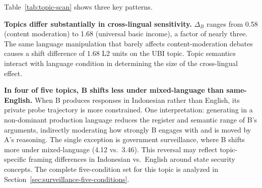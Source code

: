 \documentclass{article}
\begin{document}
\begin{table}[t]
\centering
\caption{Cross-lingual topic divergence scan: five topics ranked by Agent~B's private-probe-shift divergence between mixed-language and same-English conditions (Qwen2.5-7B-Instruct, seed 17, 4 turns, Indonesian/English). $D_B$ values are L2 distances in 8D Schwartz space. Direction: $<$ means B shifts less under mixed-language than same-English; $>$ means the reverse.}
\label{tab:topic-scan}
\end{table}

Table~\ref{tab:topic-scan} shows three key patterns.

\textbf{Topics differ substantially in cross-lingual sensitivity.} $\Delta_B$ ranges from 0.58 (content moderation) to 1.68 (universal basic income), a factor of nearly three. The same language manipulation that barely affects content-moderation debates causes a shift difference of 1.68 L2 units on the UBI topic. Topic semantics interact with language condition in determining the size of the cross-lingual effect.

\textbf{In four of five topics, B shifts less under mixed-language than same-English.} When B produces responses in Indonesian rather than English, its private probe trajectory is more constrained. One interpretation: generating in a non-dominant production language reduces the register and semantic range of B's arguments, indirectly moderating how strongly B engages with and is moved by A's reasoning. The single exception is government surveillance, where B shifts more under mixed-language (4.12 vs.\ 3.46). This reversal may reflect topic-specific framing differences in Indonesian vs.\ English around state security concepts. The complete five-condition set for this topic is analyzed in Section~\ref{sec:surveillance-five-conditions}.
\end{document}
